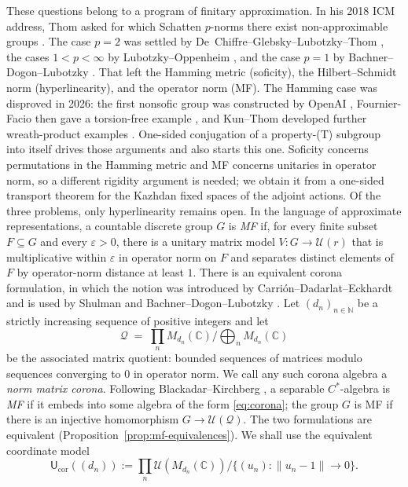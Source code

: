 \documentclass[11pt]{amsart}
\theoremstyle{definition}
\theoremstyle{remark}
\theoremstyle{plain}
\newcommand{\C}{\mathbb C}
\newcommand{\N}{\mathbb N}
\newcommand{\U}{\mathcal U}
\newcommand{\Ucor}{\mathsf U_{\mathrm{cor}}}
\newcommand{\opnorm}[1]{\left\lVert #1\right\rVert}
\begin{document}
These questions belong to a program of finitary
approximation.  In his 2018 ICM address, Thom asked for which Schatten
$p$-norms there exist non-approximable groups \cite[Question~3.11]{Th}.
The case $p=2$ was settled by De~Chiffre--Glebsky--Lubotzky--Thom
\cite{DGLT}, the cases $1<p<\infty$ by Lubotzky--Oppenheim \cite{LuO},
and the case $p=1$ by Bachner--Dogon--Lubotzky \cite{BDL}.  That left
the Hamming metric (soficity), the Hilbert--Schmidt norm
(hyperlinearity), and the operator norm (MF)\@.  The Hamming case was disproved in 2026:
the first nonsofic group was constructed by OpenAI \cite{OAI},
Fournier-Facio then gave a torsion-free example \cite{FFF}, and
Kun--Thom developed further wreath-product examples \cite{KT}.
One-sided conjugation of a property-\textup{(T)} subgroup into itself
drives those arguments and also starts this one.  Soficity concerns
permutations in the Hamming metric and MF concerns unitaries in
operator norm, so a different rigidity argument is needed; we obtain it
from a one-sided transport theorem for the Kazhdan fixed spaces of the
adjoint actions.  Of the three problems, only hyperlinearity remains
open.
In the language of approximate representations, a countable discrete
group $G$ is \emph{MF} if, for every finite subset $F\subseteq G$ and
every $\varepsilon>0$, there is a unitary matrix model
$V\colon G\to\U(r)$ that is multiplicative within $\varepsilon$ in
operator norm on $F$ and separates distinct elements of $F$ by
operator-norm distance at least $1$.  There is an equivalent corona
formulation, in which the notion was introduced by
Carri\'on--Dadarlat--Eckhardt and is used by Shulman and
Bachner--Dogon--Lubotzky \cite{CDE,Shulman,BDL}.  Let $(d_n)_{n\in\N}$
be a strictly increasing sequence of positive integers and let
\begin{equation}\label{eq:corona}
  \mathcal Q\;=\;\prod_{n} M_{d_n}(\C)\Big/\bigoplus_{n} M_{d_n}(\C)
\end{equation}
be the associated matrix quotient: bounded sequences of matrices
modulo sequences converging to $0$ in operator norm.  We call any such
corona algebra a \emph{norm matrix corona}.  Following
Blackadar--Kirchberg \cite{BK}, a separable $C^*$-algebra is \emph{MF}
if it embeds into some algebra of the form \eqref{eq:corona}; the group
$G$ is MF if there is an injective homomorphism
$G\to\U(\mathcal Q)$.
The two formulations are equivalent
(Proposition~\ref{prop:mf-equivalences}).
We shall use the equivalent coordinate model
\begin{equation}\label{eq:unitary-corona}
 \Ucor((d_n))
 :=\prod_n\U(M_{d_n}(\C))\Big/
 \bigl\{(u_n):\opnorm{u_n-1}\longrightarrow0\bigr\}.
\end{equation}
\end{document}
